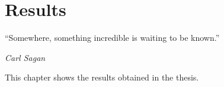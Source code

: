 \chapter{Results}
\label{c:results}

\epigraph{\enquote{Somewhere, something incredible is waiting to be known.}}{\emph{Carl Sagan}}

This chapter shows the results obtained in the thesis.
